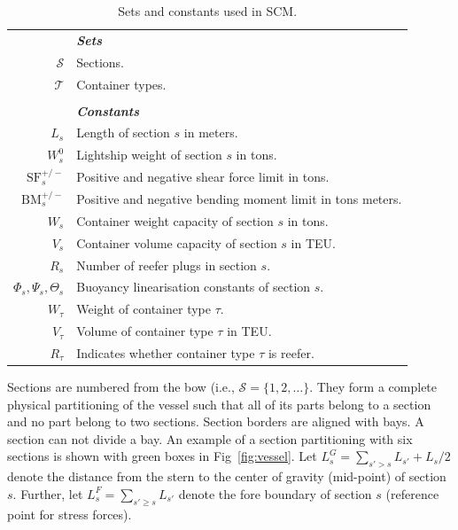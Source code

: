 \documentclass[runningheads]{llncs}
\begin{document}
\begin{table}[h!]
\begin{center}
\begin{tabular}{rl}
    & \textbf{\textit{Sets}}\\
    $\mathcal{S}$ & Sections.\\
    $\mathcal{T}$ & Container types. \\
    & \\
    & \textbf{\textit{Constants}}\\
    $L_s$         & Length of section $s$ in meters.\\
    $W^0_s$       & Lightship weight of section $s$ in tons.\\
    $\mathrm{SF}^{+/-}_s$ & Positive and negative shear force limit in tons.\\ 
    $\mathrm{BM}^{+/-}_s$ & Positive and negative bending moment limit in tons meters.\\ 
    $W_s$         & Container weight capacity of section $s$ in tons.\\
    $V_s$         & Container volume capacity of section $s$ in TEU.\\
    $R_s$         & Number of reefer plugs in section $s$.\\ 
    $\Phi_s,\Psi_s,\Theta_s$ & Buoyancy linearisation constants of section $s$.\\        
    $W_\tau$      & Weight of container type $\tau$.\\
    $V_\tau$      & Volume of container type $\tau$ in TEU.\\
    $R_\tau$      & Indicates whether container type $\tau$ is reefer.\\
\end{tabular}
\end{center}
\caption{Sets and constants used in SCM.}
\label{tab:setsconstants}
\end{table}

Sections are numbered from the bow (i.e., $\mathcal{S} = \{ 1,2,\ldots \}$. They form a complete physical partitioning of the vessel such that all of its parts belong to a section and no part belong to two sections. Section borders are aligned with bays. A section can not divide a bay. An example of a section partitioning with six sections is shown with green boxes in Fig~\ref{fig:vessel}. Let $L^G_s = \sum_{s'>s} L_{s'} + L_s / 2$ denote the distance from the stern to the center of gravity (mid-point) of section $s$. Further, let $L^F_s = \sum_{s' \geq s} L_{s'}$ denote the fore boundary of section $s$ (reference point for stress forces).
\end{document}
